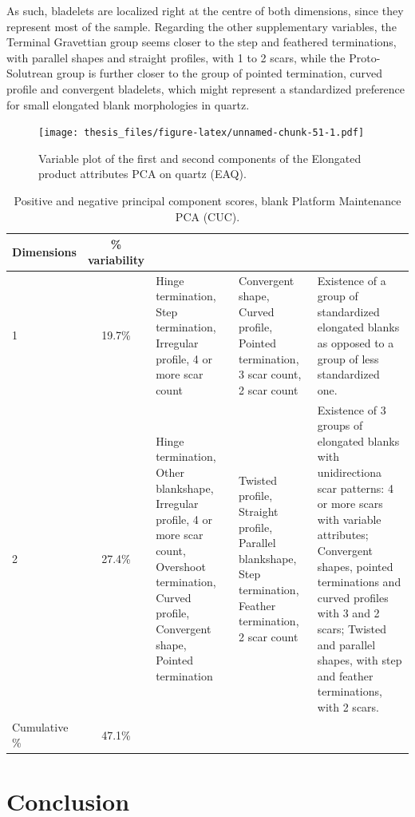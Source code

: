 \documentclass[12pt,twoside]{reedthesis}
\begin{document}
As such, bladelets are localized right at the centre of both dimensions, since they represent most of the sample. Regarding the other supplementary variables, the Terminal Gravettian group seems closer to the step and feathered terminations, with parallel shapes and straight profiles, with 1 to 2 scars, while the Proto-Solutrean group is further closer to the group of pointed termination, curved profile and convergent bladelets, which might represent a standardized preference for small elongated blank morphologies in quartz.
\begin{figure}
\centering
\texttt{[image: thesis\_files/figure-latex/unnamed-chunk-51-1.pdf]}
\caption{\label{fig:unnamed-chunk-51}Variable plot of the first and second components of the Elongated product attributes PCA on quartz (EAQ).}
\end{figure}
\begin{table}

\caption{\label{tab:unnamed-chunk-52}Positive and negative principal component scores, blank Platform Maintenance PCA (CUC).}
\centering
\begin{tabular}[t]{lc>{\raggedright\arraybackslash}p{3cm}>{\raggedright\arraybackslash}p{3cm}>{\raggedright\arraybackslash}p{3cm}}
\toprule
\multicolumn{1}{c}{\textbf{Dimensions}} & \multicolumn{1}{c}{\textbf{\% variability}} & \multicolumn{1}{>{\centering\arraybackslash}p{3cm}}{\textbf{+}} & \multicolumn{1}{>{\centering\arraybackslash}p{3cm}}{\textbf{-}} & \multicolumn{1}{>{\centering\arraybackslash}p{3cm}}{\textbf{Interpretation}}\\
\midrule
1 & 19.7\% & Hinge termination, Step termination, Irregular profile, 4 or more scar count & Convergent shape, Curved profile, Pointed termination, 3 scar count, 2 scar count & Existence of a group of standardized elongated blanks as opposed to a group of less standardized one.\\
2 & 27.4\% & Hinge termination, Other blankshape, Irregular profile, 4 or more scar count, Overshoot termination, Curved profile, Convergent shape, Pointed termination & Twisted profile, Straight profile, Parallel blankshape, Step termination, Feather termination, 2 scar count & Existence of 3 groups of elongated blanks with unidirectiona scar patterns: 4 or more scars with variable attributes; Convergent shapes, pointed terminations and curved profiles with 3 and 2 scars; Twisted and parallel shapes, with step and feather terminations, with 2 scars.\\
Cumulative \% & 47.1\% &  &  & \\
\bottomrule
\end{tabular}
\end{table}
\hypertarget{conclusion}{%
\chapter*{Conclusion}\label{conclusion}}
\end{document}
